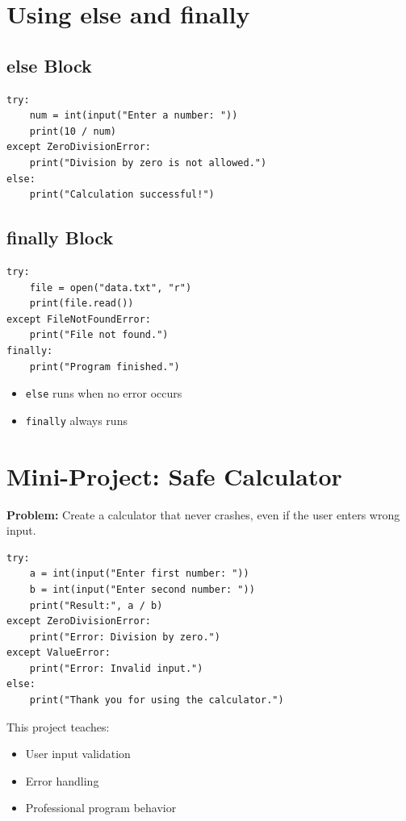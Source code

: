 \section{Using else and finally}

\subsection{else Block}

\begin{verbatim}
try:
    num = int(input("Enter a number: "))
    print(10 / num)
except ZeroDivisionError:
    print("Division by zero is not allowed.")
else:
    print("Calculation successful!")
\end{verbatim}

\subsection{finally Block}

\begin{verbatim}
try:
    file = open("data.txt", "r")
    print(file.read())
except FileNotFoundError:
    print("File not found.")
finally:
    print("Program finished.")
\end{verbatim}

\begin{itemize}
    \item \texttt{else} runs when no error occurs
    \item \texttt{finally} always runs
\end{itemize}

\section{Mini-Project: Safe Calculator}

\textbf{Problem:}  
Create a calculator that never crashes, even if the user enters wrong input.

\begin{verbatim}
try:
    a = int(input("Enter first number: "))
    b = int(input("Enter second number: "))
    print("Result:", a / b)
except ZeroDivisionError:
    print("Error: Division by zero.")
except ValueError:
    print("Error: Invalid input.")
else:
    print("Thank you for using the calculator.")
\end{verbatim}

This project teaches:
\begin{itemize}
    \item User input validation
    \item Error handling
    \item Professional program behavior
\end{itemize}

